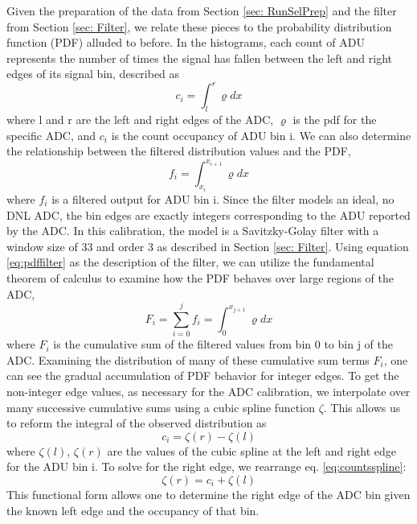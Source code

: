 \documentclass[linenumbers]{aastex7}
\begin{document}
Given the preparation of the data from Section \ref{sec: RunSelPrep} and the filter from Section \ref{sec: Filter}, we relate these pieces to the probability distribution function (PDF) alluded to before.
In the histograms, each count of ADU represents the number of times the signal has fallen between the left and right edges of its signal bin, described as
 \begin{equation}
c_i =  \int_{l}^{r} \varrho dx
\label{eq:pdfcounts}
\end{equation}
where l and r are the left and right edges of the ADC, $\varrho$ is the pdf for the specific ADC, and $c_i$ is the count occupancy of ADU bin i. 
We can also determine the relationship between the filtered distribution values and the PDF,
 \begin{equation}
f_i =  \int_{x_i}^{x_{i+1}} \varrho dx
\label{eq:pdffilter}
\end{equation}
where $f_{i}$ is a filtered output for ADU bin i.
Since the filter models an ideal, no DNL ADC, the bin edges are exactly integers corresponding to the ADU reported by the ADC.
In this calibration, the model is a Savitzky-Golay filter with a window size of 33 and order 3 as described in Section \ref{sec: Filter}. 
Using equation \ref{eq:pdffilter} as the description of the filter, we can utilize the fundamental theorem of calculus to examine how the PDF behaves over large regions of the ADC, 
\begin{equation}
F_{i}=\sum_{i=0}^{j} f_i= \int_{0}^{x_{j+1}} \varrho dx
\label{eq:fidef}
\end{equation}
where $F_i$ is the cumulative sum of the filtered values from bin 0 to bin j of the ADC. 
Examining the distribution of many of these cumulative sum terms $F_i$, one can see the gradual accumulation of PDF behavior for integer edges. 
To get the non-integer edge values, as necessary for the ADC calibration, we interpolate over many successive cumulative sums using a cubic spline function $\zeta$. 
This allows us to reform the integral of the observed distribution as
 \begin{equation}
c_i = \zeta(r) - \zeta(l)
\label{eq:countsspline}
\end{equation}
where $\zeta(l)$, $\zeta(r)$ are the values of the cubic spline at the left and right edge for the ADU bin i.
To solve for the right edge, we rearrange eq. \ref{eq:countsspline}: 
 \begin{equation}
\zeta(r) = c_i + \zeta(l) 
\label{eq:splineright}
\end{equation}
This functional form allows one to determine the right edge of the ADC bin given the known left edge and the occupancy of that bin. 
\end{document}
